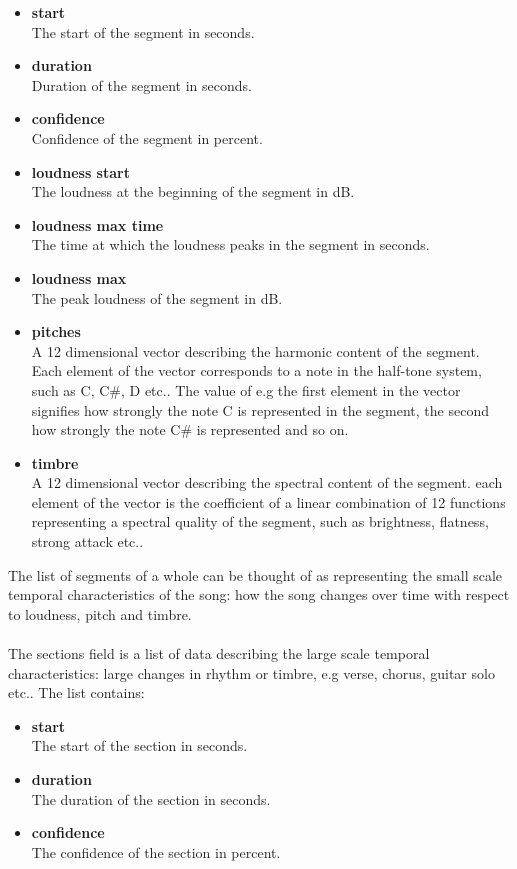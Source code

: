 \begin{itemize}
	\item \textbf{start} \\The start of the segment in seconds.
	\item \textbf{duration} \\Duration of the segment in seconds.
	\item \textbf{confidence} \\Confidence of the segment in percent.
	\item \textbf{loudness start} \\The loudness at the beginning of the segment in dB.
	\item \textbf{loudness max time} \\The time at which the loudness peaks in the segment in seconds.
	\item \textbf{loudness max} \\The peak loudness of the segment in dB.
	\item \textbf{pitches} \\A 12 dimensional vector describing the harmonic content of the segment. Each element of the vector corresponds to a note in the half-tone system, such as C, C\#, D etc.. The value of e.g the first element in the vector signifies how strongly the note C is represented in the segment, the second how strongly the note C\# is represented and so on.
	\item \textbf{timbre} \\A 12 dimensional vector describing the spectral content of the segment. each element of the vector is the coefficient of a linear combination of 12 functions representing a spectral quality of the segment, such as brightness, flatness, strong attack etc..
\end{itemize}
\noindent The list of segments of a whole can be thought of as representing the small scale temporal characteristics of the song: how the song changes over time with respect to loudness, pitch and timbre.
\\\\
The sections field is a list of data describing the large scale temporal characteristics: large changes in rhythm or timbre, e.g verse, chorus, guitar solo etc.. The list contains:
\begin{itemize}
	\item \textbf{start} \\The start of the section in seconds.
	\item \textbf{duration} \\The duration of the section in seconds.
	\item \textbf{confidence} \\The confidence of the section in percent.
\end{itemize}

